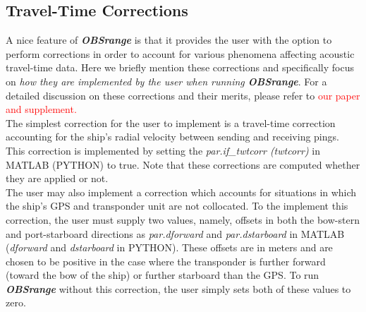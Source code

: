 \documentclass[titlepage, 12pt]{article}
\begin{document}
  \newpage
  
  \subsection{Travel-Time Corrections}
   \label{subsection:TTCs}

   A nice feature of \textbf{\textit{OBSrange}} is that it provides the user with the option to perform corrections in order to account for various phenomena affecting acoustic travel-time data. Here we briefly mention these corrections and specifically focus on \textit{how they are implemented by the user when running \textbf{OBSrange}}. For a detailed discussion on these corrections and their merits, please refer to \textcolor{red}{our paper and supplement.}\\

   The simplest correction for the user to implement is a travel-time correction accounting for the ship's radial velocity between sending and receiving pings. This correction is implemented by setting the \textit{par.if\_twtcorr (twtcorr)} in MATLAB (PYTHON) to true. Note that these corrections are computed whether they are applied or not.\\ 
   
   The user may also implement a correction which accounts for situations in which the ship's GPS and transponder unit are not collocated. To the implement this correction, the user must supply two values, namely, offsets in both the bow-stern and port-starboard directions as \textit{par.dforward} and \textit{par.dstarboard} in MATLAB (\textit{dforward} and \textit{dstarboard} in PYTHON). These offsets are in meters and are chosen to be positive in the case where the transponder is further forward (toward the bow of the ship) or further starboard than the GPS. To run \textbf{\textit{OBSrange}} without this correction, the user simply sets both of these values to zero.\\
\end{document}

